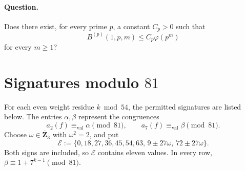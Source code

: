 \documentclass[11pt]{article}
\theoremstyle{plain}
\theoremstyle{definition}
\theoremstyle{remark}
\numberwithin{equation}{section}
\begin{document}
\paragraph{Question.} Does there exist, for every prime \(p\), a constant \(C_p>0\) such that \[B^{(p)}(1,p,m)\leq C_p\varphi(p^m) \] for every \(m\geq1\)?

\clearpage
\appendix

\section{Signatures modulo \texorpdfstring{\(81\)}{81}}
\label{app:p3-signatures}

For each even weight residue \(k\bmod54\), the permitted signatures are listed below. The entries \(\alpha,\beta\) represent the congruences \[ a_2(f)\equiv_{\mathrm{val}}\alpha\pmod{81}, \qquad a_7(f)\equiv_{\mathrm{val}}\beta\pmod{81}. \] Choose \(\omega\in\overline{\mathbf Z}_3\) with \(\omega^2=2\), and put \[ \mathcal E:= \{0,18,27,36,45,54,63,\, 9\pm27\omega,\,72\pm27\omega\}. \] Both signs are included, so \(\mathcal E\) contains eleven values. In every row, \(\beta\equiv1+7^{k-1}\pmod{81}\).
\end{document}
